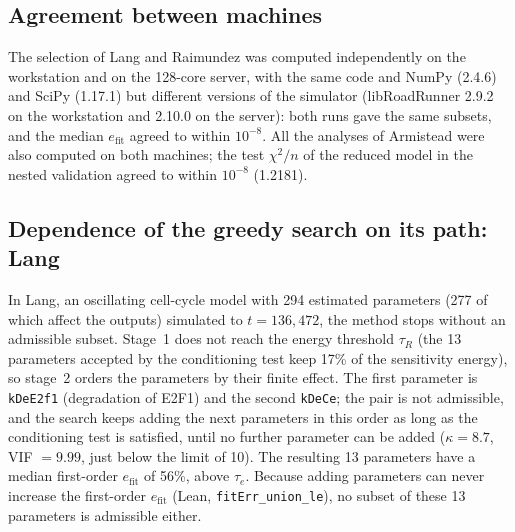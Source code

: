 \subsection*{Agreement between machines}
The selection of Lang and Raimundez was computed independently on the workstation and on the 128-core server, with the same code and NumPy (2.4.6) and SciPy (1.17.1) but different versions of the simulator (libRoadRunner 2.9.2 on the workstation and 2.10.0 on the server): both runs gave the same subsets, and the median $e_{\mathrm{fit}}$ agreed to within $10^{-8}$. All the analyses of Armistead were also computed on both machines; the test $\chi^2/n$ of the reduced model in the nested validation agreed to within $10^{-8}$ (1.2181).

\subsection*{Dependence of the greedy search on its path: Lang}
In Lang, an oscillating cell-cycle model with 294 estimated parameters (277 of which affect the outputs) simulated to $t=136{,}472$, the method stops without an admissible subset. Stage~1 does not reach the energy threshold $\tau_R$ (the 13 parameters accepted by the conditioning test keep 17\% of the sensitivity energy), so stage~2 orders the parameters by their finite effect. The first parameter is \texttt{kDeE2f1} (degradation of E2F1) and the second \texttt{kDeCe}; the pair is not admissible, and the search keeps adding the next parameters in this order as long as the conditioning test is satisfied, until no further parameter can be added ($\kappa=8.7$, VIF $=9.99$, just below the limit of 10). The resulting 13 parameters have a median first-order $e_{\mathrm{fit}}$ of 56\%, above $\tau_e$. Because adding parameters can never increase the first-order $e_{\mathrm{fit}}$ (Lean, \texttt{fitErr\_union\_le}), no subset of these 13 parameters is admissible either.

